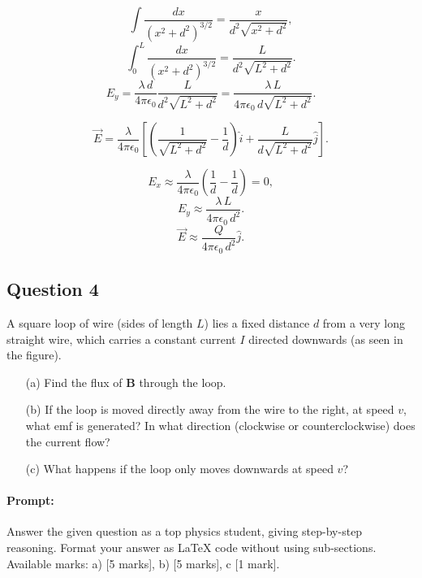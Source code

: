 \documentclass{article}
\begin{document}
\[
\int \frac{dx}{(x^2+d^2)^{3/2}} = \frac{x}{d^2\sqrt{x^2+d^2}},
\]
\[
\int_{0}^{L}\frac{dx}{(x^2+d^2)^{3/2}} = \frac{L}{d^2\sqrt{L^2+d^2}}.
\]
\[
E_y=\frac{\lambda\,d}{4\pi\epsilon_0}\frac{L}{d^2\sqrt{L^2+d^2}}=\frac{\lambda\,L}{4\pi\epsilon_0\,d\sqrt{L^2+d^2}}.
\]

\[
\boxed{
\vec{E}=\frac{\lambda}{4\pi\epsilon_0}\left[\left(\frac{1}{\sqrt{L^2+d^2}}-\frac{1}{d}\right)\hat{i}+\frac{L}{d\sqrt{L^2+d^2}}\hat{j}\right].
}
\]



\[
E_x\approx\frac{\lambda}{4\pi\epsilon_0}\left(\frac{1}{d}-\frac{1}{d}\right)=0,
\]
\[
E_y\approx\frac{\lambda\,L}{4\pi\epsilon_0\,d^2}.
\]
\[
\boxed{
\vec{E}\approx\frac{Q}{4\pi\epsilon_0\,d^2}\hat{j}.
}
\]


\subsection{Question 4}
A square loop of wire (sides of length $L$) lies a fixed distance $d$ from a very long straight wire, which carries a constant current $I$ directed downwards (as seen in the figure).

\begin{enumerate}
    \item[(a)] Find the flux of $\mathbf{B}$ through the loop.
    \item[(b)] If the loop is moved directly away from the wire to the right, at speed $v$, what emf is generated? In what direction (clockwise or counterclockwise) does the current flow?
    \item[(c)] What happens if the loop only moves downwards at speed $v$?
\end{enumerate}


\paragraph{Prompt: \\} 
Answer the given question as a top physics student, giving step-by-step reasoning. Format your answer as LaTeX code without using sub-sections. Available marks: a) [5 marks], b) [5 marks], c [1 mark].
\end{document}
